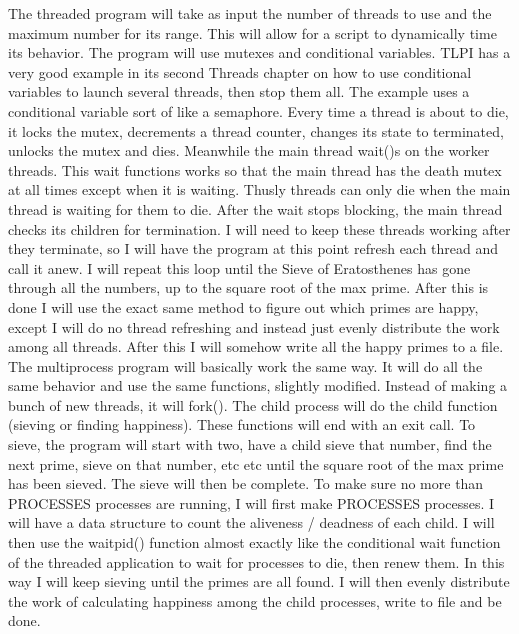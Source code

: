 \documentclass[11pt]{article}
\begin{document}
The threaded program will take as input the number of threads to use and the maximum number for its range. This will allow for a script to dynamically time its behavior. The program will use mutexes and conditional variables. TLPI has a very good example in its second Threads chapter on how to use conditional variables to launch several threads, then stop them all. The example uses a conditional variable sort of like a semaphore. Every time a thread is about to die, it locks the mutex, decrements a thread counter, changes its state to terminated, unlocks the mutex and dies. Meanwhile the main thread wait()s on the worker threads. This wait functions works so that the main thread has the death mutex at all times except when it is waiting. Thusly threads can only die when the main thread is waiting for them to die. After the wait stops blocking, the main thread checks its children for termination. I will need to keep these threads working after they terminate, so I will have the program at this point refresh each thread and call it anew. I will repeat this loop until the Sieve of Eratosthenes has gone through all the numbers, up to the square root of the max prime. After this is done I will use the exact same method to figure out which primes are happy, except I will do no thread refreshing and instead just evenly distribute the work among all threads. After this I will somehow write all the happy primes to a file.\\

The multiprocess program will basically work the same way. It will do all the same behavior and use the same functions, slightly modified. Instead of making a bunch of new threads, it will fork(). The child process will do the child function (sieving or finding happiness). These functions will end with an exit call. To sieve, the program will start with two, have a child sieve that number, find the next prime, sieve on that number, etc etc until the square root of the max prime has been sieved. The sieve will then be complete. To make sure no more than PROCESSES processes are running, I will first make PROCESSES processes. I will have a data structure to count the aliveness / deadness of each child. I will then use the waitpid() function almost exactly like the conditional wait function of the threaded application to wait for processes to die, then renew them. In this way I will keep sieving until the primes are all found. I will then evenly distribute the work of calculating happiness among the child processes, write to file and be done. \\
\end{document}
